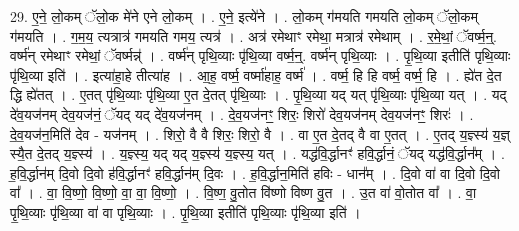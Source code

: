 \documentclass[17pt]{extarticle}
\begin{document}
29. ए॒ने॒ लो॒कम् ॅलो॒क मे॑ने एने लो॒कम् । . ए॒ने॒ इत्ये॑ने । . लो॒कम् ग॑मयति गमयति लो॒कम् ॅलो॒कम् ग॑मयति । . ग॒म॒य॒ त्यत्रात्र॑ गमयति गमय॒ त्यत्र॑ । . अत्र॑ रमेथाꣳ रमेथा॒ मत्रात्र॑ रमेथाम् । . र॒मे॒थां॒ ॅवर्ष्म॒न्॒. वर्ष्म॑न् रमेथाꣳ रमेथां॒ ॅवर्ष्मन्न्॑ । . वर्ष्म॑न् पृथि॒व्याः पृ॑थि॒व्या वर्ष्म॒न्॒. वर्ष्म॑न् पृथि॒व्याः । . पृ॒थि॒व्या इतीति॑ पृथि॒व्याः पृ॑थि॒व्या इति॑ । . इत्या॑हा॒हे तीत्या॑ह । . आ॒ह॒ वर्ष्म॒ वर्ष्मा॑हाह॒ वर्ष्म॑ । . वर्ष्म॒ हि हि वर्ष्म॒ वर्ष्म॒ हि । . ह्ये॑त दे॒त द्धि ह्ये॑तत् । . ए॒तत् पृ॑थि॒व्याः पृ॑थि॒व्या ए॒त दे॒तत् पृ॑थि॒व्याः । . पृ॒थि॒व्या यद् यत् पृ॑थि॒व्याः पृ॑थि॒व्या यत् । . यद् दे॑व॒यज॑नम् देव॒यज॑नं॒ ॅयद् यद् दे॑व॒यज॑नम् । . दे॒व॒यज॑नꣳ॒॒ शिरः॒ शिरो॑ देव॒यज॑नम् देव॒यज॑नꣳ॒॒ शिरः॑ । . दे॒व॒यज॑न॒मिति॑ देव - यज॑नम् । . शिरो॒ वै वै शिरः॒ शिरो॒ वै । . वा ए॒त दे॒तद् वै वा ए॒तत् । . ए॒तद् य॒ज्ञ्स्य॑ य॒ज्ञ् स्यै॒त दे॒तद् य॒ज्ञ्स्य॑ । . य॒ज्ञ्स्य॒ यद् यद् य॒ज्ञ्स्य॑ य॒ज्ञ्स्य॒ यत् । . यद्ध॑वि॒र्द्धानꣳ॑ हवि॒र्द्धानं॒ ॅयद् यद्ध॑वि॒र्द्धान᳚म् । . ह॒वि॒र्द्धान॑म् दि॒वो दि॒वो ह॑वि॒र्द्धानꣳ॑ हवि॒र्द्धान॑म् दि॒वः । . ह॒वि॒र्द्धान॒मिति॑ हविः - धान᳚म् । . दि॒वो वा॑ वा दि॒वो दि॒वो वा᳚ । . वा॒ वि॒ष्णो॒ वि॒ष्णो॒ वा॒ वा॒ वि॒ष्णो॒ । . वि॒ष्ण॒ वु॒तोत वि॑ष्णो विष्ण वु॒त । . उ॒त वा॑ वो॒तोत वा᳚ । . वा॒ पृ॒थि॒व्याः पृ॑थि॒व्या वा॑ वा पृथि॒व्याः । . पृ॒थि॒व्या इतीति॑ पृथि॒व्याः पृ॑थि॒व्या इति॑ । \newline
\end{document}
